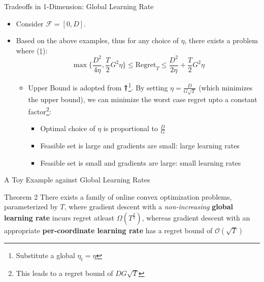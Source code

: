 \documentclass[
	11pt, %
]{beamer}
\begin{document}
\begin{frame}{Tradeoffs in 1-Dimension: Global Learning Rate}
    \begin{itemize}
        \item Consider $\mathcal{F} = [0,D]$.
        \item Based on the above examples, thus for any choice of $\eta$, there exists a problem where ($\ddag$):
        $$
        \max \{\frac{D^2}{4\eta}, \frac{T}{2} G^2 \eta\} \le \text{Regret}_T \le \frac{D^2}{2\eta} + \frac{T}{2} G^2 \eta
        $$
        \begin{itemize}
            \item Upper Bound is adopted from $\textbf{\dag}$\footnote{Substitute a global $\eta_t = \eta$}. By setting $\eta = \frac{D}{G\sqrt{T}}$ (which minimizes the upper bound), we can minimize the worst case regret upto a constant factor\footnote{This leads to a regret bound of $DG\sqrt{T}$}:
            \begin{itemize}
                \item Optimal choice of $\eta$ is proportional to $\frac{D}{G}$
                \item Feasible set is large and gradients are small: large learning rates
                \item Feasible set is small and gradients are large: small learning rates
            \end{itemize}
        \end{itemize}
    \end{itemize}
\end{frame}

\begin{frame}{A Toy Example against Global Learning Rates}
    \begin{block}{Theorem 2}
        There exists a family of online convex optimization problems, parameterized by $T$, where gradient descent with a \textit{non-increasing} \textbf{global learning rate} incurs regret atleast $\Omega(T^{\frac{2}{3}})$, whereas gradient descent with an appropriate \textbf{per-coordinate learning rate} has a regret bound of $\mathcal{O}(\sqrt{T})$
    \end{block}
\end{frame}
\end{document}
